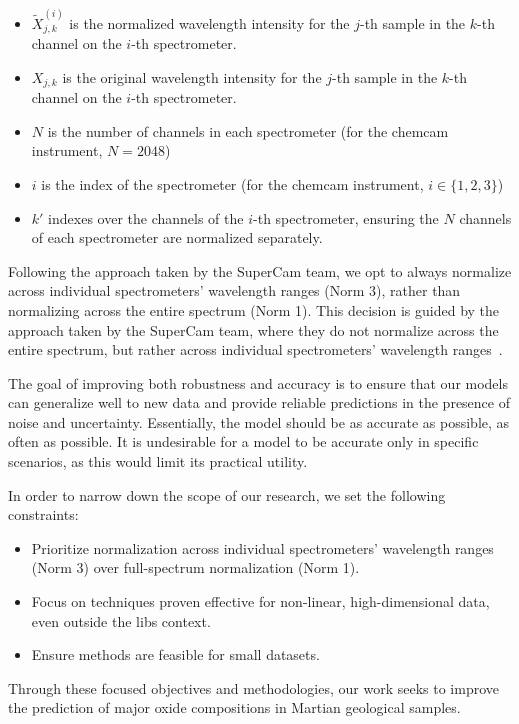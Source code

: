 \begin{itemize}
    \item $\tilde{X}_{j,k}^{(i)}$ is the normalized wavelength intensity for the $j$-th sample in the $k$-th channel on the $i$-th spectrometer.
    \item $X_{j,k}$ is the original wavelength intensity for the $j$-th sample in the $k$-th channel on the $i$-th spectrometer.
    \item $N$ is the number of channels in each spectrometer (for the \gls{chemcam} instrument, $N = 2048$)
    \item $i$ is the index of the spectrometer (for the \gls{chemcam} instrument, $i \in \{1, 2, 3\}$)
    \item $k'$ indexes over the channels of the $i$-th spectrometer, ensuring the $N$ channels of each spectrometer are normalized separately.
\end{itemize}

Following the approach taken by the SuperCam team, we opt to always normalize across individual spectrometers' wavelength ranges (Norm 3), rather than normalizing across the entire spectrum (Norm 1).
This decision is guided by the approach taken by the SuperCam team, where they do not normalize across the entire spectrum, but rather across individual spectrometers' wavelength ranges~\cite{andersonPostlandingMajorElement2022}.

The goal of improving both robustness and accuracy is to ensure that our models can generalize well to new data and provide reliable predictions in the presence of noise and uncertainty.
Essentially, the model should be as accurate as possible, as often as possible.
It is undesirable for a model to be accurate only in specific scenarios, as this would limit its practical utility.

In order to narrow down the scope of our research, we set the following constraints:
\begin{itemize}
    \item Prioritize normalization across individual spectrometers' wavelength ranges (Norm 3) over full-spectrum normalization (Norm 1).
    \item Focus on techniques proven effective for non-linear, high-dimensional data, even outside the \gls{libs} context.
    \item Ensure methods are feasible for small datasets.
\end{itemize}

Through these focused objectives and methodologies, our work seeks to improve the prediction of major oxide compositions in Martian geological samples.